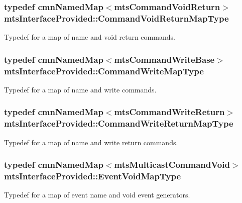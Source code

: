 \subsubsection[{Command\+Void\+Return\+Map\+Type}]{\setlength{\rightskip}{0pt plus 5cm}typedef {\bf cmn\+Named\+Map}$<${\bf mts\+Command\+Void\+Return}$>$ {\bf mts\+Interface\+Provided\+::\+Command\+Void\+Return\+Map\+Type}}\label{classmts_interface_provided_a963eeb4ba8e38411de4d40f983d5b4b3}
Typedef for a map of name and void return commands. \hypertarget{classmts_interface_provided_ad6809b9c0d16a2eb490429e6adace990}{}
\subsubsection[{Command\+Write\+Map\+Type}]{\setlength{\rightskip}{0pt plus 5cm}typedef {\bf cmn\+Named\+Map}$<${\bf mts\+Command\+Write\+Base}$>$ {\bf mts\+Interface\+Provided\+::\+Command\+Write\+Map\+Type}}\label{classmts_interface_provided_ad6809b9c0d16a2eb490429e6adace990}
Typedef for a map of name and write commands. \hypertarget{classmts_interface_provided_aaf1b5a70c029bb3c3bc2280ae1513c01}{}
\subsubsection[{Command\+Write\+Return\+Map\+Type}]{\setlength{\rightskip}{0pt plus 5cm}typedef {\bf cmn\+Named\+Map}$<${\bf mts\+Command\+Write\+Return}$>$ {\bf mts\+Interface\+Provided\+::\+Command\+Write\+Return\+Map\+Type}}\label{classmts_interface_provided_aaf1b5a70c029bb3c3bc2280ae1513c01}
Typedef for a map of name and write return commands. \hypertarget{classmts_interface_provided_a81dc5f40eef8155cfc0ddad74c5c1b6a}{}
\subsubsection[{Event\+Void\+Map\+Type}]{\setlength{\rightskip}{0pt plus 5cm}typedef {\bf cmn\+Named\+Map}$<${\bf mts\+Multicast\+Command\+Void}$>$ {\bf mts\+Interface\+Provided\+::\+Event\+Void\+Map\+Type}}\label{classmts_interface_provided_a81dc5f40eef8155cfc0ddad74c5c1b6a}
Typedef for a map of event name and void event generators. \hypertarget{classmts_interface_provided_a98f1388a3c2119a1ae97f19302eeb550}{}

